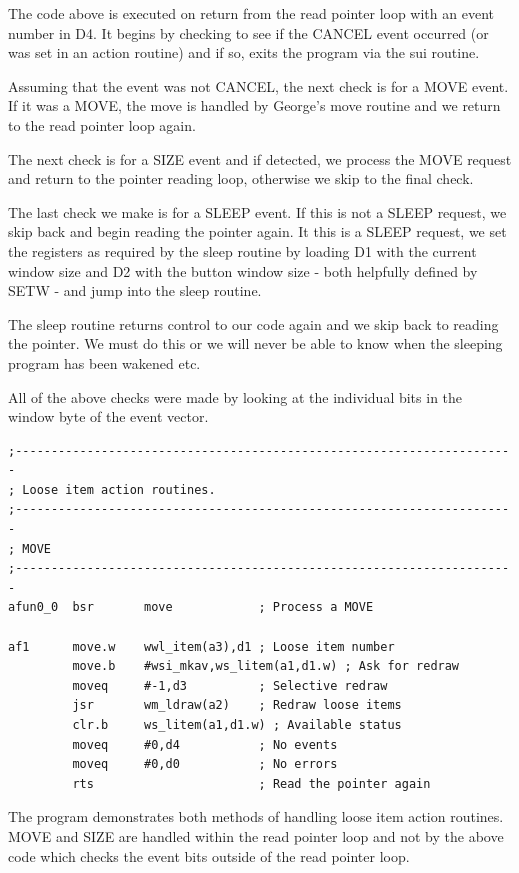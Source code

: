 The code above is executed on return from the read pointer loop with an
        event number in D4. It begins by checking to see if the CANCEL event occurred (or
        was set in an action routine) and if so, exits the program via the sui
        routine.

Assuming that the event was not CANCEL, the next check is for a MOVE event.
        If it was a MOVE, the move is handled by George's move routine and we return to
        the read pointer loop again.

The next check is for a SIZE event and if detected, we process the MOVE
        request and return to the pointer reading loop, otherwise we skip to the final
        check.

The last check we make is for a SLEEP event. If this is not a SLEEP request,
        we skip back and begin reading the pointer again. It this is a SLEEP request, we
        set the registers as required by the sleep routine by loading D1 with the current
        window size and D2 with the button window size -{} both helpfully defined by
 SETW -{} and jump into the sleep routine.

The sleep routine returns control to our code again and we skip back to
        reading the pointer. We must do this or we will never be able to know when the
        sleeping program has been wakened etc.

All of the above checks were made by looking at the individual bits in the
        window byte of the event vector.

\begin{lstlisting}[firstnumber=last,caption={Ex0 - Move Loose Item Action Routine}]
;----------------------------------------------------------------------
; Loose item action routines.
;----------------------------------------------------------------------
; MOVE
;----------------------------------------------------------------------
afun0_0  bsr       move            ; Process a MOVE

af1      move.w    wwl_item(a3),d1 ; Loose item number
         move.b    #wsi_mkav,ws_litem(a1,d1.w) ; Ask for redraw
         moveq     #-1,d3          ; Selective redraw
         jsr       wm_ldraw(a2)    ; Redraw loose items
         clr.b     ws_litem(a1,d1.w) ; Available status
         moveq     #0,d4           ; No events
         moveq     #0,d0           ; No errors
         rts                       ; Read the pointer again
\end{lstlisting}

The program demonstrates both methods of handling loose item action
        routines. MOVE and SIZE are handled within the read pointer loop and not by the
        above code which checks the event bits outside of the read pointer loop.

